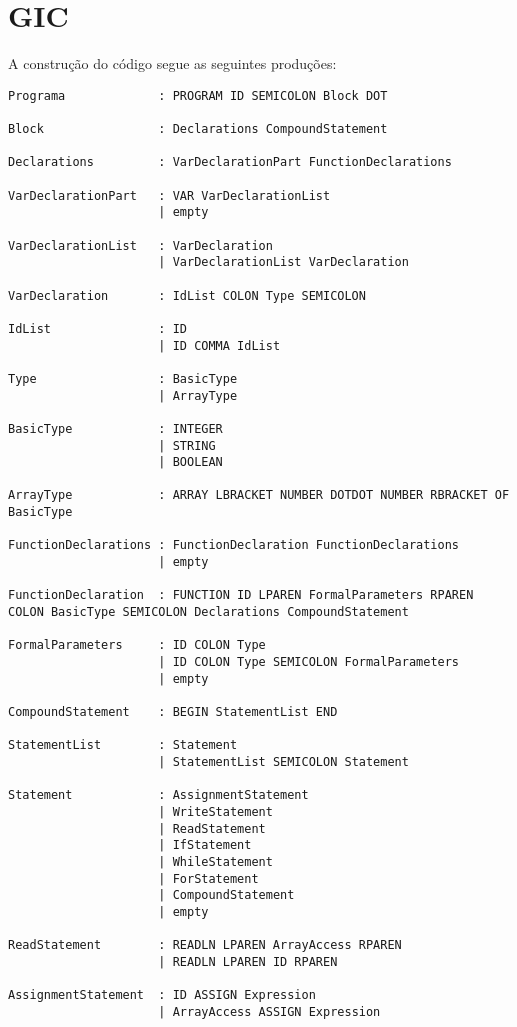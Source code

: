 \documentclass[12pt,a4paper]{report}%
\begin{document}
\section{GIC}
A construção do código segue as seguintes produções:  
\begin{verbatim}
Programa             : PROGRAM ID SEMICOLON Block DOT

Block                : Declarations CompoundStatement

Declarations         : VarDeclarationPart FunctionDeclarations

VarDeclarationPart   : VAR VarDeclarationList
                     | empty

VarDeclarationList   : VarDeclaration
                     | VarDeclarationList VarDeclaration

VarDeclaration       : IdList COLON Type SEMICOLON

IdList               : ID
                     | ID COMMA IdList

Type                 : BasicType
                     | ArrayType

BasicType            : INTEGER
                     | STRING
                     | BOOLEAN

ArrayType            : ARRAY LBRACKET NUMBER DOTDOT NUMBER RBRACKET OF BasicType

FunctionDeclarations : FunctionDeclaration FunctionDeclarations
                     | empty

FunctionDeclaration  : FUNCTION ID LPAREN FormalParameters RPAREN COLON BasicType SEMICOLON Declarations CompoundStatement

FormalParameters     : ID COLON Type
                     | ID COLON Type SEMICOLON FormalParameters
                     | empty

CompoundStatement    : BEGIN StatementList END

StatementList        : Statement
                     | StatementList SEMICOLON Statement

Statement            : AssignmentStatement
                     | WriteStatement
                     | ReadStatement
                     | IfStatement
                     | WhileStatement
                     | ForStatement
                     | CompoundStatement
                     | empty

ReadStatement        : READLN LPAREN ArrayAccess RPAREN
                     | READLN LPAREN ID RPAREN

AssignmentStatement  : ID ASSIGN Expression
                     | ArrayAccess ASSIGN Expression


\end{verbatim}
\end{document}
